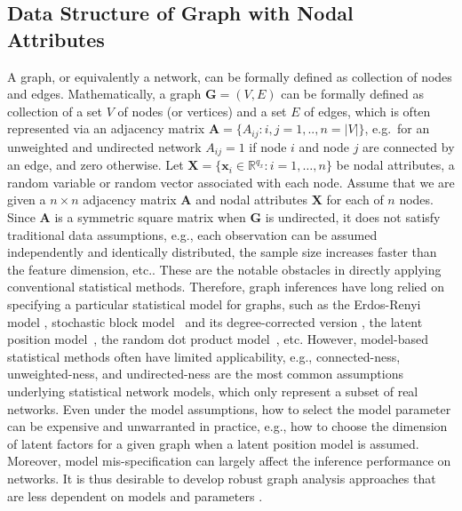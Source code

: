 \documentclass[11pt]{article}
\theoremstyle{definition}
\begin{document}
\subsection{Data Structure of Graph with Nodal Attributes}
A graph, or equivalently a network, can be formally defined as collection of nodes and edges.
Mathematically, a graph $\mathbf{G}=(V,E)$ can be formally defined as collection of a set $V$ of nodes (or vertices) and a set $E$ of edges, which is often represented via an adjacency matrix $\mathbf{A} = \{A_{ij} : i,j= 1,..,n = |V| \}$, e.g.~for an unweighted and undirected network $A_{ij} = 1$ if node $i$ and node $j$ are connected by an edge, and zero otherwise. Let $\mathbf{X} = \{  \mathbf{x}_{i} \in \mathbb{R}^{q_{x}} : i = 1, \ldots, n \}$ be nodal attributes, a random variable or random vector associated with each node. Assume that we are given a $n \times n$ adjacency matrix $\mathbf{A}$ and nodal attributes $\mathbf{X}$ for each of $n$ nodes. Since $\mathbf{A}$ is a symmetric square matrix when $\mathbf{G}$ is undirected, it does not satisfy traditional data assumptions, e.g., each observation can be assumed independently and identically distributed, the sample size increases faster than the feature dimension, etc.. These are the notable obstacles in directly applying conventional statistical methods. Therefore, graph inferences have long relied on specifying a particular statistical model for graphs, such as the Erdos-Renyi model \cite{erdosrenyi1959,Gilbert1959}, stochastic block model~\cite{HollandEtAl1983, rohe2011spectral,SussmanEtAl2012,Lei2015} and its degree-corrected version \cite{karrer2011stochastic, ZhaoLevinaZhu2012}, the latent position model~\cite{TangSussmanPriebe2013,fosdick2015testing}, the random dot product model~\cite{YoungScheinerman2007, sussman2014consistent}, etc. However, model-based statistical methods often have limited applicability, e.g., connected-ness, unweighted-ness, and undirected-ness are the most common assumptions underlying statistical network models, which only represent a subset of real networks. Even under the model assumptions, how to select the model parameter can be expensive and unwarranted in practice, e.g., how to choose the dimension of latent factors for a given graph when a latent position model is assumed. Moreover, model mis-specification can largely affect the inference performance on networks. It is thus desirable to develop robust graph analysis approaches that are less dependent on models and parameters \cite{ChenShenVogelsteinPriebe2016}.
\end{document}
